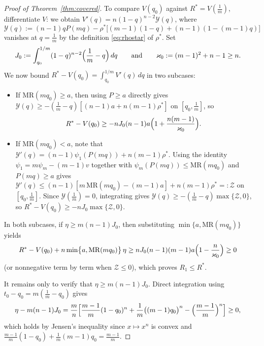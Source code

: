 \documentclass[12pt]{article}
\theoremstyle{mystyle}
\theoremstyle{mystyle2}
\newcommand{\1}{\mathbf{1}}
\begin{document}
\begin{proof}[Proof of Theorem~\ref{thm:covered}]
To compare $V(q_0)$ against $R^*=V(\frac{1}{m})$, differentiate $V$: we obtain $V'(q)=n(1-q)^{n-2}\mathcal Y(q)$, where
\[
\mathcal Y(q) := (n-1)q P(mq) - \rho^*\bigl[(m-1)(1-q)+(n-1)(1-(m-1)q)\bigr]
\]
vanishes at $q=\frac{1}{m}$ by the definition \eqref{eq:rhostar} of $\rho^*$. Set
\[
J_0 := \int_{q_0}^{1/m}(1-q)^{n-2}\Bigl(\frac{1}{m}-q\Bigr)\,dq \qquad \text{and} \qquad \varkappa_0 := (m-1)^2 + n - 1 \ge n.
\]
We now bound $R^*-V(q_0)=\int_{q_0}^{1/m}V'(q)\,dq$ in two subcases:
\begin{itemize}
\item If $\mathrm{MR}(mq_0)\ge a$, then using $P\ge a$ directly gives $\mathcal Y(q)\ge -(\frac{1}{m}-q)[(n-1)a+n(m-1)\rho^*]$ on $[q_0,\frac{1}{m}]$, so
\[
R^* - V(q_0) \ge -nJ_0(n-1)a\Bigl(1+\frac{n(m-1)}{\varkappa_0}\Bigr).
\]
\item If $\mathrm{MR}(mq_0)<a$, note that $\mathcal Y'(q)=(n-1)\psi_1(P(mq))+n(m-1)\rho^*$. Using the identity $\psi_1=m\psi_m-(m-1)v$ together with $\psi_m(P(mq))\le\mathrm{MR}(mq_0)$ and $P(mq)\ge a$ gives $\mathcal Y'(q)\le (n-1)[m\,\mathrm{MR}(mq_0)-(m-1)a]+n(m-1)\rho^*=:\mathcal Z$ on $[q_0,\frac{1}{m}]$. Since $\mathcal Y(\frac{1}{m})=0$, integrating gives $\mathcal Y(q)\ge -(\frac{1}{m}-q)\max\{\mathcal Z,0\}$, so $R^*-V(q_0)\ge -nJ_0\max\{\mathcal Z,0\}$.
\end{itemize}
In both subcases, if $\eta\ge m(n-1)J_0$, then substituting $\min\{a,\mathrm{MR}(mq_0)\}$ yields
\[
R^* - V(q_0) + n\min\bigl\{a,\mathrm{MR}(mq_0)\bigr\}\,\eta \ge nJ_0(n-1)(m-1)a\Bigl(1-\frac{n}{\varkappa_0}\Bigr) \ge 0
\]
(or nonnegative term by term when $\mathcal Z\le 0$), which proves $R_1\le R^*$.

It remains only to verify that $\eta\ge m(n-1)J_0$. Direct integration using $t_0-q_0=m(\frac{1}{m}-q_0)$ gives
\[
\eta - m(n-1)J_0 = \frac{m}{n}\Bigl[\frac{m-1}{m}(1-q_0)^n + \frac{1}{m}\bigl((m-1)q_0\bigr)^n - \Bigl(\frac{m-1}{m}\Bigr)^n\Bigr] \ge 0,
\]
which holds by Jensen's inequality since $x\mapsto x^n$ is convex and $\frac{m-1}{m}(1-q_0)+\frac{1}{m}(m-1)q_0=\frac{m-1}{m}$.
\end{proof}
\end{document}
